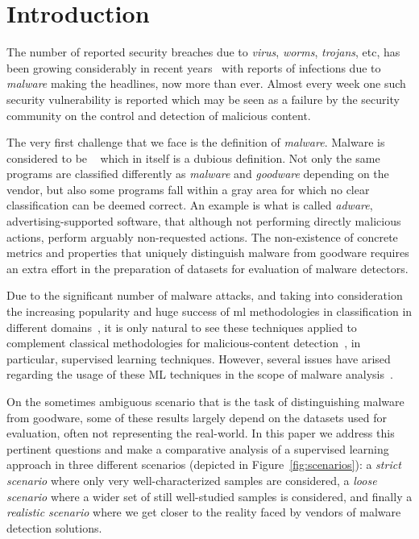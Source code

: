 

\section{Introduction}\label{sec:intro}

The number of reported security breaches due to \emph{virus}, \emph{worms}, \emph{trojans}, etc, has been growing considerably in recent years~\cite{av-test:report} with reports of infections due to \emph{malware}  making the headlines, now more than ever.
Almost every week one such security vulnerability is reported which may be seen as a failure by the security community on the control and detection of malicious content. 

The very first challenge that we face is the definition of \emph{malware}.
Malware is considered to be ~\cite{christodorescu:semantics} which in itself is a dubious definition. 
Not only the same programs are classified differently as \emph{malware} and \emph{goodware} depending on the vendor, but also some programs fall within a gray area for which no clear classification can be deemed correct.
An example is what is called \emph{adware}, advertising-supported software, that although not performing directly malicious actions, perform arguably non-requested actions.
The non-existence of concrete metrics and properties that uniquely distinguish malware from goodware requires an extra effort in the preparation of datasets for evaluation of malware detectors.

Due to the significant number of malware attacks, and taking into consideration the increasing popularity and huge success of \gls{ml} methodologies in classification in different domains~\cite{lee2003learning,joachims2002learning,li2010object,ding2001multi}, it is only natural to see these techniques applied to complement classical methodologies for malicious-content detection~\cite{arp2014drebin,christodorescu:semantics,kolosnjaji2016deep,kolter:learning,miller:rev_int,nissim:al_pdf,perdisci:behavior,rieck:dynamic,santos2013opcode,schultz:data_mining,schwenk2012autonomous,vsrndic2013detection,deo2016prescience,gandotra2014malware,jordaney2017transcend,rossow:practices}, in particular, supervised learning techniques.
However, several issues have arised regarding the usage of these ML techniques in the scope of malware analysis~\cite{deo2016prescience,gandotra2014malware,jordaney2017transcend,rossow:practices}.

On the sometimes ambiguous scenario that is the task of distinguishing malware from goodware, some of these results largely depend on the datasets used for evaluation, often not representing the real-world. 
In this paper we address this pertinent questions and make a comparative analysis of a supervised learning approach in three different scenarios (depicted in Figure~\ref{fig:scenarios}): a \emph{strict scenario} where only very well-characterized samples are considered, a \emph{loose scenario} where a wider set of still well-studied samples is considered, and finally a \emph{realistic scenario} where we get closer to the reality faced by vendors of malware detection solutions.

